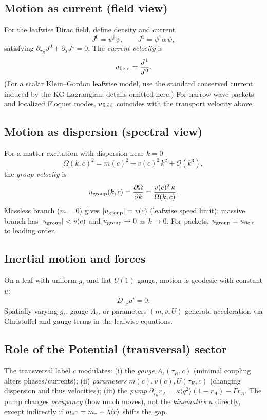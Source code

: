\documentclass[11pt]{article}
\begin{document}
\subsection{Motion as current (field view)}
For the leafwise Dirac field, define density and current
\begin{equation}
J^0=\psi^\dagger\psi,\qquad J^1=\psi^\dagger\alpha\,\psi,
\end{equation}
satisfying $\partial_{\tau_R}J^0+\partial_s J^1=0$.
The \emph{current velocity} is
\begin{equation}
u_{\rm field}=\frac{J^1}{J^0}.
\end{equation}
(For a scalar Klein--Gordon leafwise model, use the standard conserved current induced by the KG Lagrangian; details omitted here.)
For narrow wave packets and localized Floquet modes, $u_{\rm field}$ coincides with the transport velocity above.

\subsection{Motion as dispersion (spectral view)}
For a matter excitation with dispersion near $k=0$
\begin{equation}
\Omega(k,c)^2=m(c)^2+v(c)^2\,k^2+\mathcal O(k^3),
\end{equation}
the \emph{group velocity} is
\begin{equation}
u_{\rm group}(k,c)=\frac{\partial \Omega}{\partial k}=\frac{v(c)^2\,k}{\Omega(k,c)}.
\end{equation}
Massless branch ($m=0$) gives $|u_{\rm group}|=v(c)$ (leafwise speed limit); massive branch has $|u_{\rm group}|<v(c)$ and $u_{\rm group}\to 0$ as $k\to 0$.
For packets, $u_{\rm group}=u_{\rm field}$ to leading order.

\subsection{Inertial motion and forces}
On a leaf with uniform $g_\ell$ and flat $U(1)$ gauge, motion is geodesic with constant $u$:
\begin{equation}
D_{\tau_R}u^i=0.
\end{equation}
Spatially varying $g_\ell$, gauge $A_\ell$, or parameters $(m,v,U)$ generate acceleration via Christoffel and gauge terms in the leafwise equations.

\subsection{Role of the Potential (transversal) sector}
The transversal label $c$ modulates:
(i) the \emph{gauge} $A_\ell(\tau_R,c)$ (minimal coupling alters phases/currents);
(ii) \emph{parameters} $m(c),v(c),U(\tau_R,c)$ (changing dispersion and thus velocities);
(iii) the \emph{pump} $\partial_{\tau_R} r_A=\kappa\langle q^2\rangle(1-r_A)-\Gamma r_A$.
The pump changes \emph{occupancy} (how much moves), not the \emph{kinematics} $u$ directly, except indirectly if $m_{\rm eff}=m_\ast+\lambda\langle r\rangle$ shifts the gap.
\end{document}
